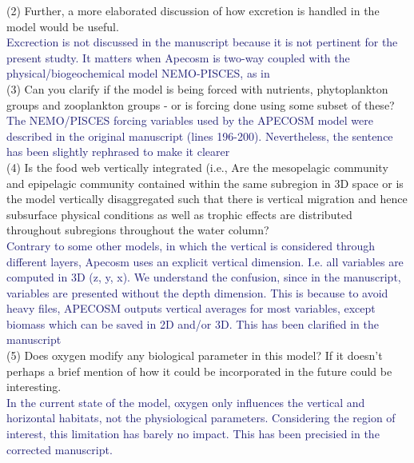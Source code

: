 \documentclass[12pt]{article}
\newcommand{\resp}[1]{\textcolor{MidnightBlue}{#1}}
\begin{document}

(2) Further, a more elaborated discussion of how excretion is handled in the model would be useful. \\ 

\resp{Excrection is not discussed in the manuscript because it is not pertinent for the present studty. It matters 
when Apecosm is two-way coupled with the physical/biogeochemical model NEMO-PISCES, as in \cite{aumontEvaluatingPotentialImpacts2018, lemezoNaturalVariabilityMarine2016, dupontHighTrophicLevel2023}} \\

(3) Can you clarify if the model is being forced with nutrients, phytoplankton groups and zooplankton groups - or is forcing done using some subset of these? \\

\resp{The NEMO/PISCES forcing variables used by the APECOSM model were described in the original manuscript (lines  196-200). Nevertheless, the sentence has been slightly rephrased to make it clearer}\\

(4) Is the food web vertically integrated (i.e., Are the mesopelagic community and epipelagic community contained within the same subregion in 3D space or is the model vertically disaggregated such that there is vertical migration and hence subsurface physical conditions as well as trophic effects are distributed throughout subregions throughout the water column? \\ 

\resp{Contrary to some other models, in which the vertical is considered through different layers, Apecosm uses an explicit vertical dimension. I.e. all variables are computed in 3D (z, y, x). We understand the confusion, since in the manuscript, variables are presented without the depth dimension. This is because to avoid heavy files, APECOSM outputs vertical averages for most variables, except biomass which can be saved in 2D and/or 3D. This has been clarified in the manuscript}\\

(5) Does oxygen modify any biological parameter in this model? If it doesn’t perhaps a brief mention of how it could be incorporated in the future could be interesting. \\ 

\resp{In the current state of the model, oxygen only influences the vertical and horizontal habitats, not the physiological parameters. Considering the region of interest, this limitation has barely no impact. This has been precisied in the corrected manuscript.}\\
\end{document}
